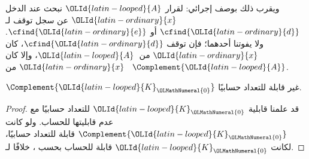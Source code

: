 \documentclass[../../../include/open-logic-section]{subfiles}
\begin{document}
\begin{explain}
ويقرب ذلك بوصف إجرائي: لقرار ${\OLId{latin-looped}{A}}$ نبحث عند الدخل
${\OLId{latin-ordinary}{x}}$ عن سجل توقف لـ$\cfind{{\OLId{latin-ordinary}{d}}}$ أو $\cfind{{\OLId{latin-ordinary}{e}}}$. ولا يفوتنا
أحدهما؛ فإن توقف $\cfind{{\OLId{latin-ordinary}{d}}}$، كان ${\OLId{latin-ordinary}{x}}$ من~${\OLId{latin-looped}{A}}$، وإلا كان ${\OLId{latin-ordinary}{x}}$ من
~$\Complement{{\OLId{latin-looped}{A}}}$.
\end{explain}

\begin{cor}
$\Complement{{\OLId{latin-looped}{K}}_{\OLMathNumeral{0}}}$ غير قابلة للتعداد حسابيًا.
\end{cor}

\begin{proof}
قد علمنا قابلية ${\OLId{latin-looped}{K}}_{\OLMathNumeral{0}}$ للتعداد حسابيًا مع عدم قابليتها للحساب. ولو كانت
$\Complement{{\OLId{latin-looped}{K}}_{\OLMathNumeral{0}}}$ قابلة للتعداد حسابيًا، لكانت ${\OLId{latin-looped}{K}}_{\OLMathNumeral{0}}$ قابلة للحساب
بحسب ، خلافًا لـ.
\end{proof}
\end{document}
